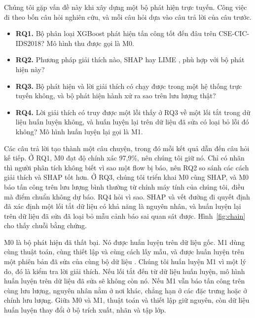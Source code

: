 \documentclass[conference]{IEEEtran}
\begin{document}
Chúng tôi gặp vấn đề này khi xây dựng một bộ phát hiện trực tuyến. Công việc đi theo bốn câu hỏi nghiên cứu, và mỗi câu hỏi dựa vào câu trả lời của câu trước.
\begin{itemize}
\item \textbf{RQ1.} Bộ phân loại XGBoost \cite{chen2016} phát hiện tấn công tốt đến đâu trên CSE-CIC-IDS2018? Mô hình thu được gọi là M0.
\item \textbf{RQ2.} Phương pháp giải thích nào, SHAP \cite{lundberg2017,lundberg2020} hay LIME \cite{ribeiro2016}, phù hợp với bộ phát hiện này?
\item \textbf{RQ3.} Bộ phát hiện và lời giải thích có chạy được trong một hệ thống trực tuyến không, và bộ phát hiện hành xử ra sao trên lưu lượng thật?
\item \textbf{RQ4.} Lời giải thích có truy được một lỗi thấy ở RQ3 về một lối tắt trong dữ liệu huấn luyện không, và huấn luyện lại trên dữ liệu đã sửa có loại bỏ lỗi đó không? Mô hình huấn luyện lại gọi là M1.
\end{itemize}

Các câu trả lời tạo thành một câu chuyện, trong đó mỗi kết quả dẫn đến câu hỏi kế tiếp. Ở RQ1, M0 đạt độ chính xác 97,9\%, nên chúng tôi giữ nó. Chỉ có nhãn thì người phân tích không biết vì sao một flow bị báo, nên RQ2 so sánh các cách giải thích và SHAP tốt hơn. Ở RQ3, chúng tôi triển khai M0 cùng SHAP, và M0 báo tấn công trên lưu lượng bình thường từ chính máy tính của chúng tôi, điều mà điểm chuẩn không dự báo. RQ4 hỏi vì sao. SHAP và vết đường đi quyết định đã xác định một lối tắt dữ liệu có khả năng là nguyên nhân, và huấn luyện lại trên dữ liệu đã sửa đã loại bỏ mẫu cảnh báo sai quan sát được. Hình~\ref{fig:chain} cho thấy chuỗi bằng chứng.

M0 là bộ phát hiện đã thất bại. Nó được huấn luyện trên dữ liệu gốc. M1 dùng cùng thuật toán, cùng thiết lập và cùng cách lấy mẫu, và được huấn luyện trên một phiên bản đã sửa của cùng bộ dữ liệu \cite{liu2022}. Chúng tôi huấn luyện M1 vì một lý do, đó là kiểm tra lời giải thích. Nếu lối tắt đến từ dữ liệu huấn luyện, mô hình huấn luyện trên dữ liệu đã sửa sẽ không còn nó. Nếu M1 vẫn báo tấn công trên cùng lưu lượng, nguyên nhân nằm ở nơi khác, chẳng hạn ở các đặc trưng hoặc ở chính lưu lượng. Giữa M0 và M1, thuật toán và thiết lập giữ nguyên, còn dữ liệu huấn luyện thay đổi ở bộ trích xuất, nhãn và tập lớp.
\end{document}
